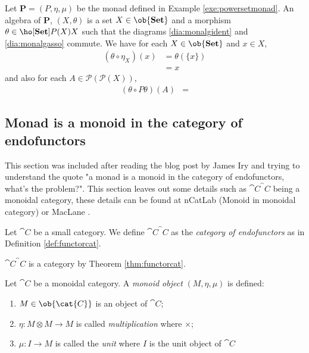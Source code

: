 \begin{example}
    \label{exe:powersetmonalg}
    Let $\mathbf{P} = (P,\eta,\mu)$ be the monad defined in Example \ref{exe:powersetmonad}. An algebra of $\mathbf{P}$, $(X,\theta)$ is a set $X\in\ob{\mathbf{Set}}$ and a morphism $\theta\in\ho[\mathbf{Set}]{P(X)}{X}$ such that the diagrams \eqref{dia:monalgident} and \eqref{dia:monalgasso} commute. We have for each $X\in\ob{\mathbf{Set}}$ and $x\in X$,
    \begin{align*}
        (\theta \circ \eta_{X})(x) &= \theta(\{x\}) \\
        &= x
    \end{align*}
    and also for each $A\in\mathcal{P}(\mathcal{P}(X))$,
    \begin{align*}
        (\theta \circ P\theta)(A) &= 
    \end{align*}
    \end{example}


\subsection{Monad is a monoid in the category of endofunctors}
\label{ss:monmon}
This section was included after reading the blog post by James Iry \cite{jamesiry} and trying to understand the quote "a monad is a monoid in the category of endofunctors, what's the problem?". This section leaves out some details such as $\cat{C}^\cat{C}$ being a monoidal category, these details can be found at nCatLab \cite{nLab} (Monoid in monoidal category) or MacLane \cite{MacLane}.
\begin{definition}
    \label{def:catofendo}
    Let $\cat{C}$ be a small category. We define $\cat{C}^\cat{C}$ as the \emph{category of endofunctors} as in Definition \ref{def:functorcat}. 
\end{definition}
\begin{remark}
    $\cat{C}^
    \cat{C}$ is a category by Theorem \ref{thm:functorcat}.
\end{remark}

\begin{definition}
    \label{def:monoidalcategory}
    
\end{definition}

\begin{definition}
    \label{def:monoidobject}
    Let $\cat{C}$ be a monoidal category. A \emph{monoid object} $(M,\eta,\mu)$ is defined:
    \begin{enumerate}
        \item $M\in\ob{\cat{C}}$ is an object of $\cat{C}$;
        \item $\eta\colon M\otimes M\to M$ is called \emph{multiplication} where $\times$;
        \item $\mu\colon I \to M$ is called the \emph{unit} where $I$ is the unit object of $\cat{C}$
    \end{enumerate}
    
\end{definition}

